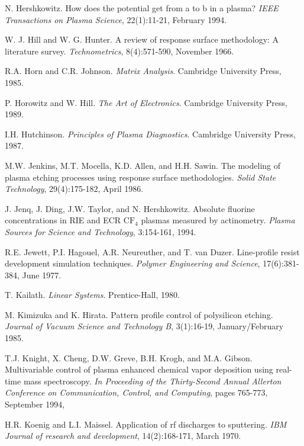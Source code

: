 \begin{thebibliography}{100}
	
	 N. Hershkowitz. How does the potential get from a to b in a plasma? \emph{IEEE Transactions on Plasma Science}, 22(1):11-21, February 1994.
	
	 W. J. Hill and W. G. Hunter. A review of response surface methodology: A literature survey. \emph{Technometrics}, 8(4):571-590, November 1966.

	
	 R.A. Horn and C.R. Johnson. \emph{Matrix Analysis}. Cambridge University Press, 1985.
	
	 P. Horowitz and W. Hill. \emph{The Art of Electronics}. Cambridge University Press, 1989.
	
	 I.H. Hutchinson. \emph{Principles of Plasma Diagnostics}. Cambridge University Press, 1987.
	
	 M.W. Jenkins, M.T. Mocella, K.D. Allen, and H.H. Sawin. The modeling of plasma etching processes using response surface methodologies. \emph{Solid State Technology}, 29(4):175-182, April 1986.
	
	 J. Jenq, J. Ding, J.W. Taylor, and N. Hershkowitz. Absolute fluorine concentrations in RIE and ECR $\text{CF}_{4}$ plasmas measured by actinometry. \emph{Plasma Sources for Science and Technology}, 3:154-161, 1994.
	
	 R.E. Jewett, P.I. Hagouel, A.R. Neureuther, and T. van Duzer. Line-profile resist development simulation techniques. \emph{Polymer Engineering and Science}, 17(6):381-384, June 1977.
	
	 T. Kailath. \emph{Linear Systems}. Prentice-Hall, 1980.
	
	 M. Kimizuka and K. Hirata. Pattern profile control of polysilicon etching. \emph{Journal of Vacuum Science and Technology B}, 3(1):16-19, January/February 1985.
	
	 T.J. Knight, X. Cheng, D.W. Greve, B.H. Krogh, and M.A. Gibson. Multivariable control of plasma enhanced chemical vapor deposition using real-time mass spectroscopy. \emph{In Proceeding of the Thirty-Second Annual Allerton Conference on Communication, Control, and Computing}, pages 765-773, September 1994,
	
	 H.R. Koenig and L.I. Maissel. Application of rf discharges to sputtering. \emph{IBM Journal of research and development}, 14(2):168-171, March 1970.
	

\end{thebibliography}
